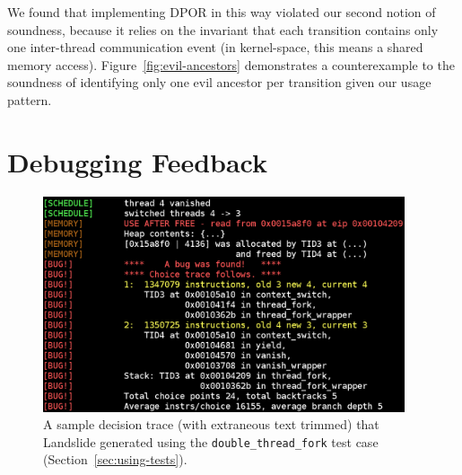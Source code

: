 We found that implementing DPOR in this way violated our second notion of soundness, because it relies on the invariant that each transition contains only one inter-thread communication event (in kernel-space, this means a shared memory access).
 Figure~\ref{fig:evil-ancestors} demonstrates a counterexample to the soundness of identifying only one evil ancestor per transition given our usage pattern.


\section{Debugging Feedback}
\label{sec:techniques-feedback}

\begin{figure}[t]
	\begin{center}
		\includegraphics[width=0.95\textwidth]{found_a_bug.png}
	\end{center}
	\caption{A sample decision trace (with extraneous text trimmed) that Landslide generated using the \texttt{double\_thread\_fork} test case (Section~\ref{sec:using-tests}).}
	\label{fig:found_a_bug}
\end{figure}

